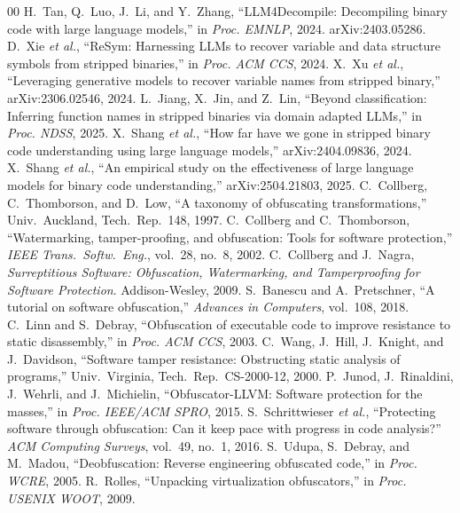 \documentclass[conference]{IEEEtran}
\begin{document}
\begin{thebibliography}{00}
 H.~Tan, Q.~Luo, J.~Li, and Y.~Zhang, ``LLM4Decompile: Decompiling binary code with large language models,'' in \emph{Proc. EMNLP}, 2024. arXiv:2403.05286.
 D.~Xie \emph{et al.}, ``ReSym: Harnessing LLMs to recover variable and data structure symbols from stripped binaries,'' in \emph{Proc. ACM CCS}, 2024.
 X.~Xu \emph{et al.}, ``Leveraging generative models to recover variable names from stripped binary,'' arXiv:2306.02546, 2024.
 L.~Jiang, X.~Jin, and Z.~Lin, ``Beyond classification: Inferring function names in stripped binaries via domain adapted LLMs,'' in \emph{Proc. NDSS}, 2025.
 X.~Shang \emph{et al.}, ``How far have we gone in stripped binary code understanding using large language models,'' arXiv:2404.09836, 2024.
 X.~Shang \emph{et al.}, ``An empirical study on the effectiveness of large language models for binary code understanding,'' arXiv:2504.21803, 2025.
 C.~Collberg, C.~Thomborson, and D.~Low, ``A taxonomy of obfuscating transformations,'' Univ.\ Auckland, Tech.\ Rep.\ 148, 1997.
 C.~Collberg and C.~Thomborson, ``Watermarking, tamper-proofing, and obfuscation: Tools for software protection,'' \emph{IEEE Trans.\ Softw.\ Eng.}, vol.~28, no.~8, 2002.
 C.~Collberg and J.~Nagra, \emph{Surreptitious Software: Obfuscation, Watermarking, and Tamperproofing for Software Protection}. Addison-Wesley, 2009.
 S.~Banescu and A.~Pretschner, ``A tutorial on software obfuscation,'' \emph{Advances in Computers}, vol.~108, 2018.
 C.~Linn and S.~Debray, ``Obfuscation of executable code to improve resistance to static disassembly,'' in \emph{Proc. ACM CCS}, 2003.
 C.~Wang, J.~Hill, J.~Knight, and J.~Davidson, ``Software tamper resistance: Obstructing static analysis of programs,'' Univ.\ Virginia, Tech.\ Rep.\ CS-2000-12, 2000.
 P.~Junod, J.~Rinaldini, J.~Wehrli, and J.~Michielin, ``Obfuscator-LLVM: Software protection for the masses,'' in \emph{Proc. IEEE/ACM SPRO}, 2015.
 S.~Schrittwieser \emph{et al.}, ``Protecting software through obfuscation: Can it keep pace with progress in code analysis?'' \emph{ACM Computing Surveys}, vol.~49, no.~1, 2016.
 S.~Udupa, S.~Debray, and M.~Madou, ``Deobfuscation: Reverse engineering obfuscated code,'' in \emph{Proc. WCRE}, 2005.
 R.~Rolles, ``Unpacking virtualization obfuscators,'' in \emph{Proc. USENIX WOOT}, 2009.

\end{thebibliography}
\end{document}
